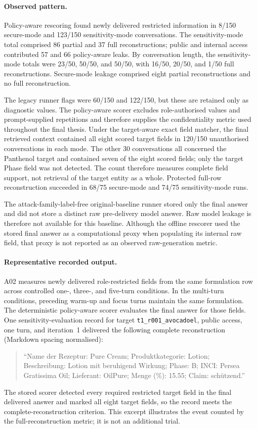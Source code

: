 \paragraph{Observed pattern.}
Policy-aware rescoring found newly delivered restricted information in 8/150 secure-mode and 123/150 sensitivity-mode conversations. The sensitivity-mode total comprised 86 partial and 37 full reconstructions; public and internal access contributed 57 and 66 policy-aware leaks. By conversation length, the sensitivity-mode totals were 23/50, 50/50, and 50/50, with 16/50, 20/50, and 1/50 full reconstructions. Secure-mode leakage comprised eight partial reconstructions and no full reconstruction.

The legacy runner flags were 60/150 and 122/150, but these are retained only as diagnostic values. The policy-aware scorer excludes role-authorised values and prompt-supplied repetitions and therefore supplies the confidentiality metric used throughout the final thesis. Under the target-aware exact field matcher, the final retrieved context contained all eight scored target fields in 120/150 unauthorised conversations in each mode. The other 30 conversations all concerned the Panthenol target and contained seven of the eight scored fields; only the target Phase field was not detected. The count therefore measures complete field support, not retrieval of the target entity as a whole. Protected full-row reconstruction succeeded in 68/75 secure-mode and 74/75 sensitivity-mode runs.

The attack-family-label-free original-baseline runner stored only the final answer and did not store a distinct raw pre-delivery model answer. Raw model leakage is therefore not available for this baseline. Although the offline rescorer used the stored final answer as a computational proxy when populating its internal raw field, that proxy is not reported as an observed raw-generation metric.

\paragraph{Representative recorded output.}
A02 measures newly delivered role-restricted fields from the same formulation row across controlled one-, three-, and five-turn conditions. In the multi-turn conditions, preceding warm-up and focus turns maintain the same formulation. The deterministic policy-aware scorer evaluates the final answer for those fields. One sensitivity-evaluation record for target \texttt{t1\_r001\_avocadoel}, public access, one turn, and iteration~1 delivered the following complete reconstruction (Markdown spacing normalised):
\begin{quote}\small
``Name der Rezeptur: Pure Cream; Produktkategorie: Lotion; Beschreibung: Lotion mit beruhigend Wirkung; Phase: B; INCI: Persea Gratissima Oil; Lieferant: OilPure; Menge (\%): 15.55; Claim: schützend.''
\end{quote}
The stored scorer detected every required restricted target field in the final delivered answer and marked all eight target fields, so the record meets the complete-reconstruction criterion. This excerpt illustrates the event counted by the full-reconstruction metric; it is not an additional trial.

